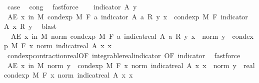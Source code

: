 \begin{isabellebody}
\ {\isacharquery}{\kern0pt}case\ \isamarkupfalse%
\ cong{\isacharparenleft}{\kern0pt}{}{\isacharparenright}{\kern0pt}\ \isamarkupfalse%
\ fastforce\isanewline
{}\isamarkupfalse%
\isanewline
\ \ \isamarkupfalse%
\ {\isacharparenleft}{\kern0pt}indicator\ A\ y{\isacharparenright}{\kern0pt}\isanewline
\ \ \isamarkupfalse%
\ {\isachardoublequoteopen}AE\ x\ in\ M{\isachardot}{\kern0pt}\ cond{\isacharunderscore}{\kern0pt}exp\ M\ F\ {\isacharparenleft}{\kern0pt}{\isasymlambda}a{\isachardot}{\kern0pt}\ indicator\ A\ a\ {\isacharasterisk}{\kern0pt}\isactrlsub R\ y{\isacharparenright}{\kern0pt}\ x\ {\isacharequal}{\kern0pt}\ cond{\isacharunderscore}{\kern0pt}exp\ M\ F\ {\isacharparenleft}{\kern0pt}indicator\ A{\isacharparenright}{\kern0pt}\ x\ {\isacharasterisk}{\kern0pt}\isactrlsub R\ y{\isachardoublequoteclose}\ \isamarkupfalse%
\ blast\isanewline
\ \ \isamarkupfalse%
\ {\isacharasterisk}{\kern0pt}{\isacharcolon}{\kern0pt}\ {\isachardoublequoteopen}AE\ x\ in\ M{\isachardot}{\kern0pt}\ norm\ {\isacharparenleft}{\kern0pt}cond{\isacharunderscore}{\kern0pt}exp\ M\ F\ {\isacharparenleft}{\kern0pt}{\isasymlambda}a{\isachardot}{\kern0pt}\ indicat{\isacharunderscore}{\kern0pt}real\ A\ a\ {\isacharasterisk}{\kern0pt}\isactrlsub R\ y{\isacharparenright}{\kern0pt}\ x{\isacharparenright}{\kern0pt}\ {\isasymle}\ norm\ y\ {\isacharasterisk}{\kern0pt}\ cond{\isacharunderscore}{\kern0pt}exp\ M\ F\ {\isacharparenleft}{\kern0pt}{\isasymlambda}x{\isachardot}{\kern0pt}\ norm\ {\isacharparenleft}{\kern0pt}indicat{\isacharunderscore}{\kern0pt}real\ A\ x{\isacharparenright}{\kern0pt}{\isacharparenright}{\kern0pt}\ x{\isachardoublequoteclose}\ \isamarkupfalse%
\ cond{\isacharunderscore}{\kern0pt}exp{\isacharunderscore}{\kern0pt}contraction{\isacharunderscore}{\kern0pt}real{\isacharbrackleft}{\kern0pt}OF\ integrable{\isacharunderscore}{\kern0pt}real{\isacharunderscore}{\kern0pt}indicator{\isacharcomma}{\kern0pt}\ OF\ indicator{\isacharbrackright}{\kern0pt}\ \isamarkupfalse%
\ fastforce\isanewline
\isanewline
\ \ \isamarkupfalse%
\ {\isachardoublequoteopen}AE\ x\ in\ M{\isachardot}{\kern0pt}\ norm\ y\ {\isacharasterisk}{\kern0pt}\ cond{\isacharunderscore}{\kern0pt}exp\ M\ F\ {\isacharparenleft}{\kern0pt}{\isasymlambda}x{\isachardot}{\kern0pt}\ norm\ {\isacharparenleft}{\kern0pt}indicat{\isacharunderscore}{\kern0pt}real\ A\ x{\isacharparenright}{\kern0pt}{\isacharparenright}{\kern0pt}\ x\ {\isacharequal}{\kern0pt}\ norm\ y\ {\isacharasterisk}{\kern0pt}\ real{\isacharunderscore}{\kern0pt}cond{\isacharunderscore}{\kern0pt}exp\ M\ F\ {\isacharparenleft}{\kern0pt}{\isasymlambda}x{\isachardot}{\kern0pt}\ norm\ {\isacharparenleft}{\kern0pt}indicat{\isacharunderscore}{\kern0pt}real\ A\ x{\isacharparenright}{\kern0pt}{\isacharparenright}{\kern0pt}\ x{\isachardoublequoteclose}\ \isamarkupfalse%

\end{isabellebody}
